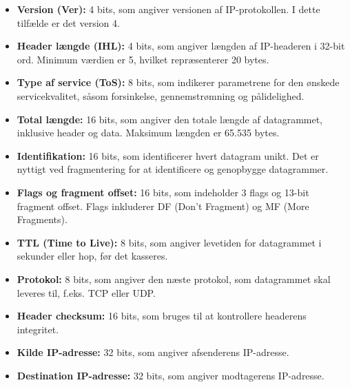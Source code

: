 \begin{itemize}
	\item \textbf{Version (Ver):} 4 bits, som angiver versionen af IP-protokollen. I dette tilfælde er det version 4.
	\item \textbf{Header længde (IHL):} 4 bits, som angiver længden af IP-headeren i 32-bit ord. Minimum værdien er 5, hvilket repræsenterer 20 bytes.
	\item \textbf{Type af service (ToS):} 8 bits, som indikerer parametrene for den ønskede servicekvalitet, såsom forsinkelse, gennemstrømning og pålidelighed.
	\item \textbf{Total længde:} 16 bits, som angiver den totale længde af datagrammet, inklusive header og data. Maksimum længden er 65.535 bytes.
	\item \textbf{Identifikation:} 16 bits, som identificerer hvert datagram unikt. Det er nyttigt ved fragmentering for at identificere og genopbygge datagrammer.
	\item \textbf{Flags og fragment offset:} 16 bits, som indeholder 3 flags og 13-bit fragment offset. Flags inkluderer DF (Don’t Fragment) og MF (More Fragments).
	\item \textbf{TTL (Time to Live):} 8 bits, som angiver levetiden for datagrammet i sekunder eller hop, før det kasseres.
	\item \textbf{Protokol:} 8 bits, som angiver den næste protokol, som datagrammet skal leveres til, f.eks. TCP eller UDP.
	\item \textbf{Header checksum:} 16 bits, som bruges til at kontrollere headerens integritet.
	\item \textbf{Kilde IP-adresse:} 32 bits, som angiver afsenderens IP-adresse.
	\item \textbf{Destination IP-adresse:} 32 bits, som angiver modtagerens IP-adresse.
\end{itemize}

